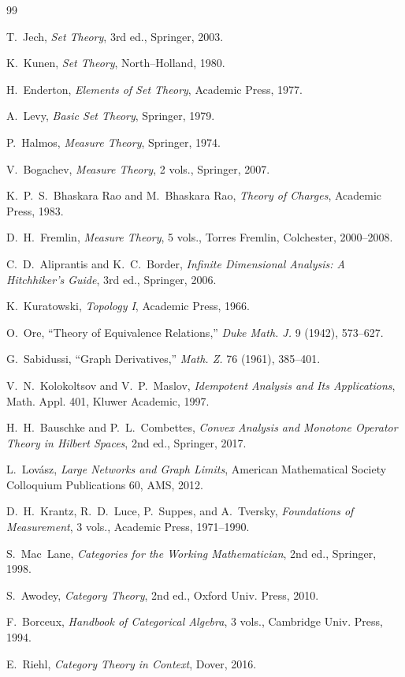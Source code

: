 \documentclass[11pt]{article}
\numberwithin{equation}{section}
\theoremstyle{definition}
\begin{document}
\begin{thebibliography}{99}

T.~Jech, \emph{Set Theory}, 3rd ed., Springer, 2003.

K.~Kunen, \emph{Set Theory}, North--Holland, 1980.

H.~Enderton, \emph{Elements of Set Theory}, Academic Press, 1977.

A.~Levy, \emph{Basic Set Theory}, Springer, 1979.

P.~Halmos, \emph{Measure Theory}, Springer, 1974.

V.~Bogachev, \emph{Measure Theory}, 2 vols., Springer, 2007.

K.~P.~S.~Bhaskara Rao and M.~Bhaskara Rao, \emph{Theory of Charges}, Academic Press, 1983.

D.~H.~Fremlin, \emph{Measure Theory}, 5 vols., Torres Fremlin, Colchester, 2000--2008.

C.~D.~Aliprantis and K.~C.~Border, \emph{Infinite Dimensional Analysis: A Hitchhiker's Guide}, 3rd ed., Springer, 2006.

K.~Kuratowski, \emph{Topology I}, Academic Press, 1966.

O.~Ore, ``Theory of Equivalence Relations,'' \emph{Duke Math. J.} 9 (1942), 573--627.

G.~Sabidussi, ``Graph Derivatives,'' \emph{Math. Z.} 76 (1961), 385--401.

V.~N.~Kolokoltsov and V.~P.~Maslov, \emph{Idempotent Analysis and Its Applications}, Math. Appl. 401, Kluwer Academic, 1997.

H.~H.~Bauschke and P.~L.~Combettes, \emph{Convex Analysis and Monotone Operator Theory in Hilbert Spaces}, 2nd ed., Springer, 2017.

L.~Lov\'asz, \emph{Large Networks and Graph Limits}, American Mathematical Society Colloquium Publications 60, AMS, 2012.

D.~H.~Krantz, R.~D.~Luce, P.~Suppes, and A.~Tversky, \emph{Foundations of Measurement}, 3 vols., Academic Press, 1971--1990.

S.~Mac~Lane, \emph{Categories for the Working Mathematician}, 2nd ed., Springer, 1998.

S.~Awodey, \emph{Category Theory}, 2nd ed., Oxford Univ. Press, 2010.

F.~Borceux, \emph{Handbook of Categorical Algebra}, 3 vols., Cambridge Univ. Press, 1994.

E.~Riehl, \emph{Category Theory in Context}, Dover, 2016.

\end{thebibliography}

\end{document}

